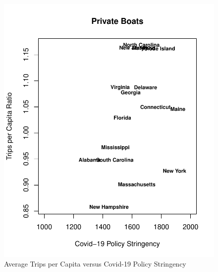 \documentclass[10pt,letterpaper]{article}
\begin{document}
\begin{figure}

{\centering \includegraphics{C19PolicyRec_files/figure-latex/tripsVstring-1} 

}

\caption{Average Trips per Capita versus Covid-19 Policy Stringency}\label{fig:tripsVstring-1}
\end{figure}
\end{document}

